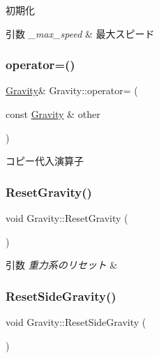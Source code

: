 初期化 


\begin{DoxyParams}{引数}
{\em \+\_\+max\+\_\+speed} & 最大スピード \\
\hline
\end{DoxyParams}
\mbox{\label{class_gravity_a68162c6452cad9eef17c6688266023c0}} 
\subsubsection{\texorpdfstring{operator=()}{operator=()}}
{\footnotesize\ttfamily \mbox{\hyperlink{class_gravity}{Gravity}}\& Gravity\+::operator= (\begin{DoxyParamCaption}\item[{const \mbox{\hyperlink{class_gravity}{Gravity}} \&}]{other }\end{DoxyParamCaption})\hspace{0.3cm}{\ttfamily [inline]}}



コピー代入演算子 

\mbox{\label{class_gravity_aa334a7ebbbd79ca28e7d29c3fc5c03ed}} 
\subsubsection{\texorpdfstring{Reset\+Gravity()}{ResetGravity()}}
{\footnotesize\ttfamily void Gravity\+::\+Reset\+Gravity (\begin{DoxyParamCaption}{ }\end{DoxyParamCaption})\hspace{0.3cm}{\ttfamily [inline]}}


\begin{DoxyParams}{引数}
{\em 重力系のリセット} & \\
\hline
\end{DoxyParams}
\mbox{\label{class_gravity_a5e430e10dea748f20c2d019e86dd339c}} 
\subsubsection{\texorpdfstring{Reset\+Side\+Gravity()}{ResetSideGravity()}}
{\footnotesize\ttfamily void Gravity\+::\+Reset\+Side\+Gravity (\begin{DoxyParamCaption}{ }\end{DoxyParamCaption})\hspace{0.3cm}{\ttfamily [inline]}}

